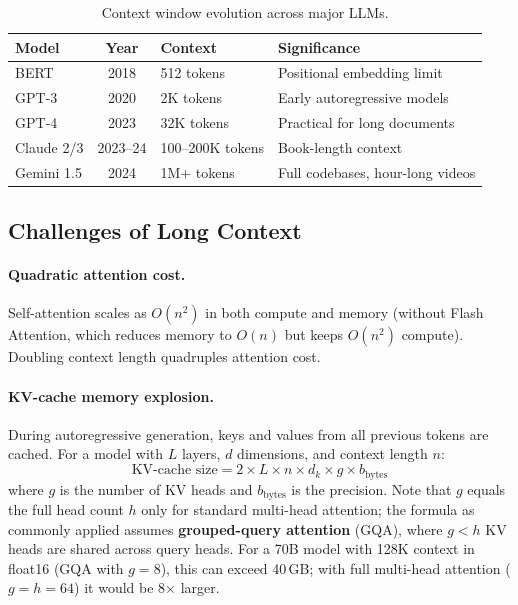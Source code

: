 \begin{table}[H]
\centering
\small
\begin{tabularx}{\textwidth}{@{}l c l X@{}}
\toprule
\textbf{Model} & \textbf{Year} & \textbf{Context} & \textbf{Significance} \\
\midrule
BERT       & 2018 & 512 tokens   & Positional embedding limit \\
GPT-3      & 2020 & 2K tokens    & Early autoregressive models \\
GPT-4      & 2023 & 32K tokens   & Practical for long documents \\
Claude 2/3 & 2023--24 & 100--200K tokens & Book-length context \\
Gemini 1.5 & 2024 & 1M+ tokens   & Full codebases, hour-long videos \\
\bottomrule
\end{tabularx}
\caption{Context window evolution across major LLMs.}
\label{tab:context_evolution}
\end{table}

\subsection{Challenges of Long Context}

\paragraph{Quadratic attention cost.}
Self-attention scales as $O(n^2)$ in both compute and memory (without Flash
Attention, which reduces memory to $O(n)$ but keeps $O(n^2)$ compute).
Doubling context length quadruples attention cost.

\paragraph{KV-cache memory explosion.}
During autoregressive generation, keys and values from all previous tokens
are cached.  For a model with $L$ layers, $d$ dimensions, and context
length $n$:
\begin{equation}
\text{KV-cache size} = 2 \times L \times n \times d_k \times g \times b_{\text{bytes}}
\label{eq:kv_cache}
\end{equation}
where $g$ is the number of KV heads and $b_{\text{bytes}}$ is the precision.
Note that $g$ equals the full head count $h$ only for standard multi-head
attention; the formula as commonly applied assumes \textbf{grouped-query
attention} (GQA), where $g < h$ KV heads are shared across query heads.
For a 70B model with 128K context in float16 (GQA with $g = 8$), this can
exceed 40\,GB; with full multi-head attention ($g = h = 64$) it would be
8$\times$ larger.

